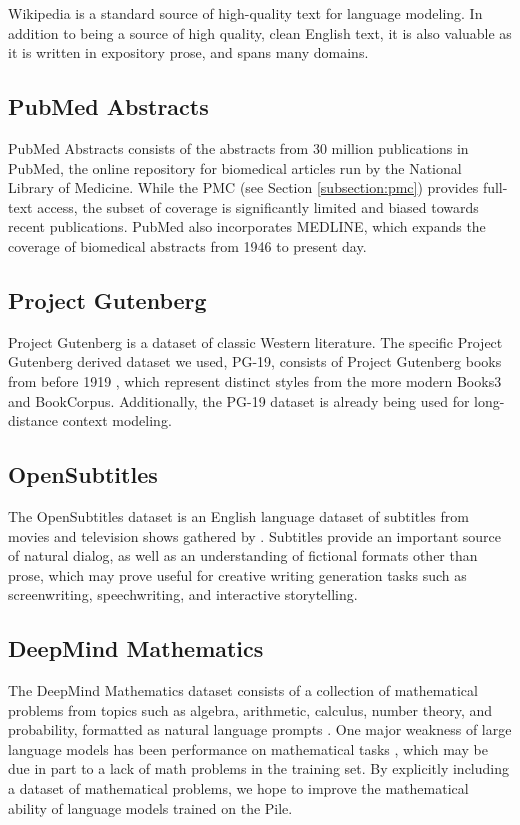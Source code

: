\documentclass[11pt,a4paper]{article}
\begin{document}
Wikipedia is a standard source of high-quality text for language modeling. In addition to being a source of high quality, clean English text, it is also valuable as it is written in expository prose, and spans many domains.

\subsection{PubMed Abstracts}

PubMed Abstracts consists of the abstracts from 30 million publications in PubMed, the online repository for biomedical articles run by the National Library of Medicine. While the PMC (see Section \ref{subsection:pmc}) provides full-text access, the subset of coverage is significantly limited and biased towards recent publications. PubMed also incorporates MEDLINE, which expands the coverage of biomedical abstracts from 1946 to present day.

\subsection{Project Gutenberg}

Project Gutenberg is a dataset of  classic Western literature. The specific Project Gutenberg derived dataset we used, PG-19, consists of Project Gutenberg books from before 1919 \citep{PG19}, which represent distinct styles from the more modern Books3 and BookCorpus. Additionally, the PG-19 dataset is already being used for long-distance context modeling.

\subsection{OpenSubtitles}

The OpenSubtitles dataset is an English language dataset of subtitles from movies and television shows gathered by \citet{OpenSubtitles}. Subtitles provide an important source of natural dialog, as well as an understanding of fictional formats other than prose, which may prove useful for creative writing generation tasks such as screenwriting, speechwriting, and interactive storytelling.

\subsection{DeepMind Mathematics}

The DeepMind Mathematics dataset consists of a collection of mathematical problems from topics such as algebra, arithmetic, calculus, number theory, and probability, formatted as natural language prompts \citep{dm-mathematics}. One major weakness of large language models has been performance on mathematical tasks \citep{GPT3}, which may be due in part to a lack of math problems in the training set. By explicitly including a dataset of mathematical problems, we hope to improve the mathematical ability of language models trained on the Pile.
\end{document}
